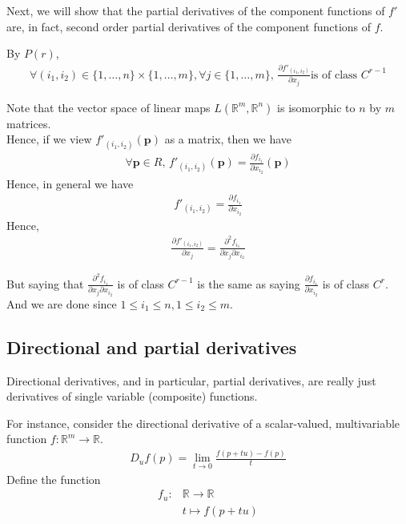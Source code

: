 \documentclass{article}
\begin{document}
Next, we will show that the partial derivatives of the component functions of $f'$ are, in fact, second order partial derivatives of the component functions of $f$.

By $P(r)$,  
\begin{align*}
	\forall (i_1,i_2)\in \{1,\dots, n\}\times \{1,\dots, m\}, \forall j\in \{1,\dots, m\}, \, \frac{\partial f'_{(i_1, i_2)}}{\partial x_j} \text{is of class } C^{r-1}
\end{align*}

Note that the vector space of linear maps $L(\mathbb{R}^m, \mathbb{R}^n)$ is isomorphic to $n$ by $m$ matrices.\\
Hence, if we view $f'_{(i_1, i_2)}(\mathbf{p})$ as a matrix, then we have
\begin{align*}
	\forall \mathbf{p}\in R, \, f'_{(i_1, i_2)}(\mathbf{p}) = \frac{\partial f_{i_1}}{\partial x_{i_2}}(\mathbf{p})
\end{align*}
Hence, in general we have
\begin{align*}
	f'_{(i_1, i_2)} = \frac{\partial f_{i_1}}{\partial x_{i_2}}
\end{align*}
Hence, 
\begin{align*}
	\frac{\partial f'_{(i_1, i_2)}}{\partial x_j} = \frac{\partial^2 f_{i_1}}{\partial x_j \partial x_{i_2}}
\end{align*}

But saying that $\frac{\partial^2 f_{i_1}}{\partial x_j \partial x_{i_2}}$ is of class $C^{r-1}$ is the same as saying $\frac{\partial f_{i_1}}{\partial x_{i_2}}$ is of class $C^r$. And we are done since $1\leq i_1\leq n, 1\leq i_2\leq m$.

\subsection{Directional and partial derivatives}
Directional derivatives, and in particular, partial derivatives, are really just derivatives of single variable (composite) functions.

For instance, consider the directional derivative of a scalar-valued, multivariable function $f: \mathbb{R}^m \rightarrow \mathbb{R}$.
\begin{align*}
	D_uf(p)=\lim_{t\rightarrow 0}\frac{f(p+tu)-f(p)}{t}
\end{align*} 
Define the function
\begin{align*}
	f_u: &\mathbb{R}\rightarrow \mathbb{R}\\
	&t \mapsto f(p+tu)
\end{align*}
\end{document}

